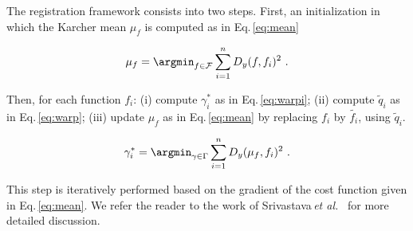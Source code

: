 The registration framework consists into two steps. First, an initialization in which the Karcher mean $\mu_f$ is computed as in Eq.\,\ref{eq:mean}

\begin{equation}
  \mu_f = \argmin_{f \in \mathcal{F}} \sum_{i = 1}^{n} D_y(f, f_i)^2 \ .
  \label{eq:mean}
\end{equation}

Then, for each function $f_i$: 
(i) compute $\gamma_{i}^{*}$ as in Eq.\,\ref{eq:warpi}; 
(ii) compute $\tilde{q}_i$ as in Eq.\,\ref{eq:warp};
(iii) update $\mu_f$ as in Eq.\,\ref{eq:mean} by replacing $f_i$ by $\tilde{f_i}$, using $\tilde{q}_i$.

\begin{equation}
  \gamma_{i}^{*} = \argmin_{\gamma \in \Gamma} \sum_{i = 1}^{n} D_y(\mu_f, f_i)^2 \ .
  \label{eq:warpi}
\end{equation}

This step is iteratively performed based on the gradient of the cost function given in Eq.\,\ref{eq:mean}. We refer the reader to the work of Srivastava\,\textit{et al.}~\cite{Srivastava2011} for more detailed discussion.


